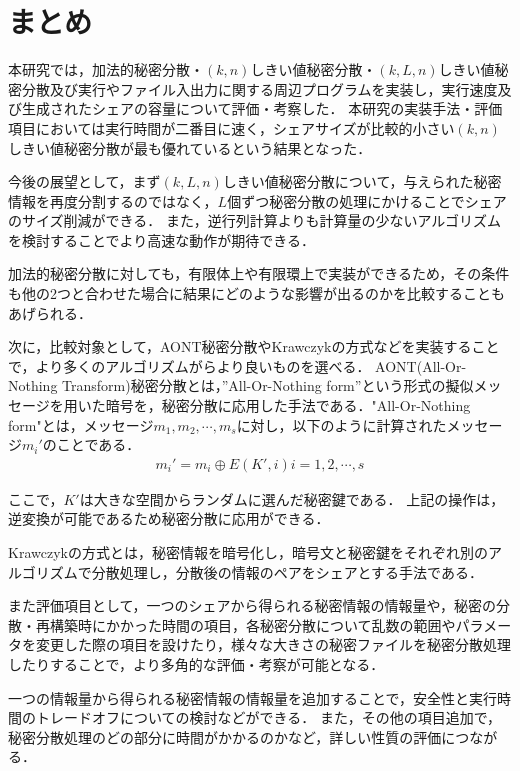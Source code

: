 \documentclass[10pt, a4paper, titlepage]{jsreport}
\begin{document}
	\chapter{まとめ}
	本研究では，加法的秘密分散・$(k,n)$しきい値秘密分散・$(k,L,n)$しきい値秘密分散及び実行やファイル入出力に関する周辺プログラムを実装し，実行速度及び生成されたシェアの容量について評価・考察した．
	本研究の実装手法・評価項目においては実行時間が二番目に速く，シェアサイズが比較的小さい$(k,n)$しきい値秘密分散が最も優れているという結果となった．

	今後の展望として，まず$(k,L,n)$しきい値秘密分散について，与えられた秘密情報を再度分割するのではなく，$L$個ずつ秘密分散の処理にかけることでシェアのサイズ削減ができる．
	また，逆行列計算よりも計算量の少ないアルゴリズムを検討することでより高速な動作が期待できる．
	
	加法的秘密分散に対しても，有限体上や有限環上で実装ができるため，その条件も他の2つと合わせた場合に結果にどのような影響が出るのかを比較することもあげられる．

	次に，比較対象として，AONT秘密分散\cite{rivest}やKrawczykの方式\cite{krawczyk}などを実装することで，より多くのアルゴリズムがらより良いものを選べる．
	AONT(All-Or-Nothing Transform)秘密分散とは，”All-Or-Nothing form”という形式の擬似メッセージを用いた暗号を，秘密分散に応用した手法である．"All-Or-Nothing form"とは，メッセージ$m_1,m_2,\cdots,m_s$に対し，以下のように計算されたメッセージ$m_i'$のことである．
	\begin{eqnarray*}
		m_i'=m_i{\oplus}E(K',i) i=1,2,{\cdots},s
	\end{eqnarray*}

	ここで，$K'$は大きな空間からランダムに選んだ秘密鍵である．
	上記の操作は，逆変換が可能であるため秘密分散に応用ができる．

	Krawczykの方式とは，秘密情報を暗号化し，暗号文と秘密鍵をそれぞれ別のアルゴリズムで分散処理し，分散後の情報のペアをシェアとする手法である．

	また評価項目として，一つのシェアから得られる秘密情報の情報量や，秘密の分散・再構築時にかかった時間の項目，各秘密分散について乱数の範囲やパラメータを変更した際の項目を設けたり，様々な大きさの秘密ファイルを秘密分散処理したりすることで，より多角的な評価・考察が可能となる．

	一つの情報量から得られる秘密情報の情報量を追加することで，安全性と実行時間のトレードオフについての検討などができる．
	また，その他の項目追加で，秘密分散処理のどの部分に時間がかかるのかなど，詳しい性質の評価につながる．
\end{document}
